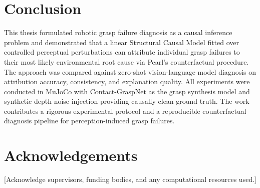 \documentclass[journal]{IEEEtran}
\begin{document}
\section{Conclusion}
\label{sec:conclusion}

This thesis formulated robotic grasp failure diagnosis as a causal
inference problem and demonstrated that a linear Structural Causal
Model fitted over controlled perceptual perturbations can attribute
individual grasp failures to their most likely environmental root
cause via Pearl's counterfactual procedure.  The approach was
compared against zero-shot vision-language model diagnosis on
attribution accuracy, consistency, and explanation quality.  All
experiments were conducted in MuJoCo with Contact-GraspNet as the
grasp synthesis model and synthetic depth noise injection providing
causally clean ground truth.  The work contributes a rigorous
experimental protocol and a reproducible counterfactual diagnosis
pipeline for perception-induced grasp failures.

\section*{Acknowledgements}

[Acknowledge supervisors, funding bodies, and any computational
resources used.]


\end{document}
